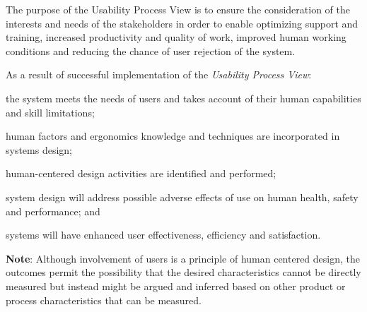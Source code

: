 		\begin{adjustwidth}{2em}{0pt}

			The purpose of the Usability Process View is to ensure the consideration of the interests and needs of the stakeholders in order to enable optimizing support and training, increased productivity and quality of work, improved human working conditions and reducing the chance of user rejection of the system.
			
			As a result of successful implementation of the {\it Usability Process View}:

			\begin{compactitem}

				\item the system meets the needs of users and takes account of their human capabilities and skill limitations;

				\item human factors and ergonomics knowledge and techniques are incorporated in systems design;

				\item human-centered design activities are identified and performed;

				\item system design will address possible adverse effects of use on human health, safety and performance; and

				\item systems will have enhanced user effectiveness, efficiency and satisfaction.

			\end{compactitem}

			{\bf Note}: Although involvement of users is a principle of human centered design, the outcomes permit the possibility that the desired characteristics cannot be directly measured but instead might be argued and inferred based on other product or process characteristics that can be measured.

		\end{adjustwidth}


